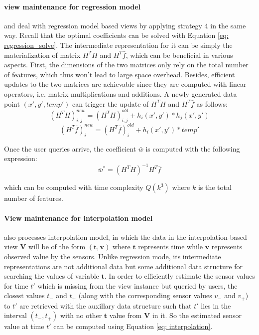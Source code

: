\paragraph{view maintenance for regression model} \cite{deshpande2006mauvedb} and \cite{gupta2015processing} deal with regression model based views by applying strategy 4 in the same way. Recall that the optimal coefficients can be solved with Equation \ref{eq: regression_solve}. The intermediate representation for it can be simply the materialization of matrix $H^TH$ and $H^T\bar{f}$, which can be beneficial in various aspects. First, the dimensions of the two matrices only rely on the total number of features, which thus won't lead to large space overhead. Besides, efficient updates to the two matrices are achievable since they are computed with linear operators, i.e. matrix multiplications and additions. A newly generated data point $(x',y', temp')$ can trigger the update of $H^TH$ and $H^T\bar{f}$ as follows:
\begin{equation}
    (H^TH)^{new}_{i,j} = (H^TH)^{old}_{i,j} + h_i(x',y')*h_j(x',y')
\end{equation}
\begin{equation}
    (H^T\bar{f})^{new}_i = (H^T\bar{f})^{old}_i + h_i(x',y')*temp'
\end{equation}

Once the user queries arrive, the coefficient $\bar{w}$ is computed with the following expression:
\begin{equation}
    \bar{w}^*=(H^TH)^{-1}H^T\bar{f}
\end{equation}

which can be computed with time complexity $Q(k^3)$ where $k$ is the total number of features.

\paragraph{View maintenance for interpolation model} \cite{deshpande2006mauvedb} also processes interpolation model, in which the data in the interpolation-based view $\textbf{V}$ will be of the form $(\textbf{t}, \textbf{v})$ where $\textbf{t}$ represents time while $\textbf{v}$ represents observed value by the sensors. Unlike regression mode, its intermediate representations are not additional data but some additional data structure for searching the values of variable $\textbf{t}$. In order to efficiently estimate the sensor values for time $t'$ which is missing from the view instance but queried by users, the closest values $t_{-}$ and $t_{+}$ (along with the corresponding sensor values $v_{-}$ and $v_{+}$) to $t'$ are retrieved with the auxillary data structure such that $t'$ lies in the interval $(t_{-}, t_{+})$ with no other $\textbf{t}$ value from $\textbf{V}$ in it. So the estimated sensor value at time $t'$ can be computed using Equation \ref{eq: interpolation}.


